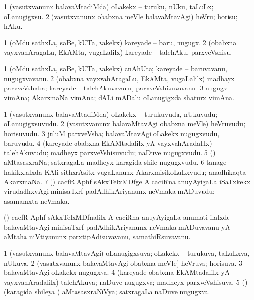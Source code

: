 \bentry
{}
\gl{\sakirx}
\bmng
\bnum
\num{1} (vasutxvanunx balavaMtadiMda) oLakekx -- turuku, nUku, taLuLx; oLanugigxsu. 
\num{2} (vasutxvanunx obabxna meVle balavaMtavAgi) heVru; horisu; hAku. 
\enum
\emng

\noindent 
\gl{\akirx}
\bmng
\bnum
\num{1} (oMdu sathxLa, saBe, kUTa, \mo vakekx) kareyade -- baru, nugugx. 
\num{2} (obabxna vayxvahAragaLu, EkAMta, \mo vugaLalilx) kareyade -- talehAku, parxveVshisu. 
\enum
\emng
\eentry

\bentry
{}
\gl{\nA}
\bmng
\bnum
\num{1} (oMdu sathxLa, saBe, kUTa, \mo vakekx) anAhUta; kareyade -- baruvavanu, nugugxvavanu. 
\num{2} (obabxna vayxvahAragaLu, EkAMta, \mo vugaLalilx) madhayx parxveVshaka; kareyade -- talehAkuvavanu, parxveVshisuvavanu. 
\num{3} nugugx vimAna; AkarxmaNa vimAna; dALi mADalu oLanugigxda shaturx vimAna. 
\enum
\emng
\eentry

\bentry
{}
\gl{\nA}
\bmng
\bnum
\num{1} (vasutxvanunx balavaMtadiMda) oLakekx -- turukuvudu, nUkuvudu; oLanugigxsuvudu. 
\num{2} (vasutxvanunx balavaMtavAgi obabxna meVle) heVruvudu; horisuvudu. 
\num{3} juluM parxveVsha; balavaMtavAgi oLakekx nugugxvudu, baruvudu. 
\num{4} (kareyade obabxna EkAMtadalilx yA vayxvahAradalilx) talehAkuvudu; madheyx parxveVshisuvudu; naDuve nugugxvudu. 
\num{5} (\BUvi) aMtasasxraNa; satxragaLa madheyx karagida shile nugugxvudu. 
\num{6} tanage hakikxlalxda KAli sithxrAsitx \mo vugaLanunx AkarxmisikoLuLxvudu; anadhikaqta AkarxmaNa. 
\num{7} (\ca) cacfR Aphf sAkxTelxMDfge A caciRna anuyAyigaLa iSaTxkekx virudadhxvAgi minisaTxrf padAdhikAriyanunx neVmaka mADuvudu; asamamxta neVmaka. 
\enum
\emng
\eentry

\bentry
{}
\gl{\nA}
\bmng
(\ca) cacfR Aphf sAkxTelxMDfnalilx A caciRna anuyAyigaLa anumati ilalxde balavaMtavAgi minisaTxrf padAdhikAriyanunx neVmaka mADuvavanu yA aMtaha niVtiyanunx parxtipAdisuvavanu, samathiRsuvavanu. 
\emng
\eentry

\bentry
{}
\gl{\gu}
\bmng
\bnum
\num{1} (vasutxvanunx balavaMtavAgi) oLanugigxsuva; oLakekx -- turukuva, taLuLxva, nUkuva. 
\num{2} (vasutxvanunx balavaMtavAgi obabxna meVle) heVruva; horisuva. 
\num{3} balavaMtavAgi oLakekx nugugxva. 
\num{4} (kareyade obabxna EkAMtadalilx yA vayxvahAradalilx) talehAkuva; naDuve nugugxva; madheyx parxveVshisuva. 
\num{5} (\BUvi) (karagida shileya \vi) aMtasasxraNiVya; satxragaLa naDuve nugugxva. 
\enum
\emng
\eentry

